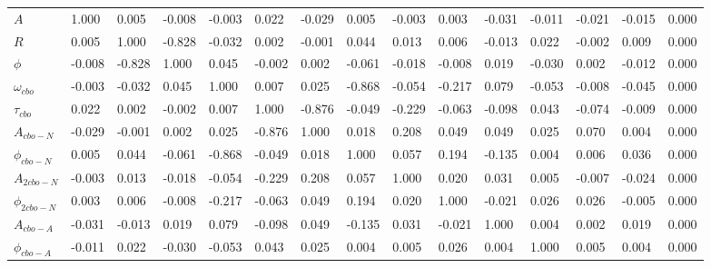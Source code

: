 \begin{landscape}
\begin{table}[]
\setlength\tabcolsep{5pt}
\footnotesize
\begin{tabular*}{\linewidth}{@{\extracolsep{\fill}}lLBLLLLLLLLLLLL}
  \toprule
            &  &  & \thead{$\phi$} &  &  &  &  &  &  &  &  &  &  &  \\
  \midrule
$A$                & 1.000 & 0.005 & -0.008 & -0.003 & 0.022 & -0.029 & 0.005 & -0.003 & 0.003 & -0.031 & -0.011 & -0.021 & -0.015 & 0.000  \\
$R$                & 0.005 & 1.000 & -0.828 & -0.032 & 0.002 & -0.001 & 0.044 & 0.013 & 0.006 & -0.013 & 0.022 & -0.002 & 0.009 & 0.000  \\
$\phi$             & -0.008 & -0.828 & 1.000 & 0.045 & -0.002 & 0.002 & -0.061 & -0.018 & -0.008 & 0.019 & -0.030 & 0.002 & -0.012 & 0.000  \\
$\omega_{cbo}$     & -0.003 & -0.032 & 0.045 & 1.000 & 0.007 & 0.025 & -0.868 & -0.054 & -0.217 & 0.079 & -0.053 & -0.008 & -0.045 & 0.000  \\
$\tau_{cbo}$       & 0.022 & 0.002 & -0.002 & 0.007 & 1.000 & -0.876 & -0.049 & -0.229 & -0.063 & -0.098 & 0.043 & -0.074 & -0.009 & 0.000  \\
$A_{cbo-N}$        & -0.029 & -0.001 & 0.002 & 0.025 & -0.876 & 1.000 & 0.018 & 0.208 & 0.049 & 0.049 & 0.025 & 0.070 & 0.004 & 0.000  \\
$\phi_{cbo-N}$     & 0.005 & 0.044 & -0.061 & -0.868 & -0.049 & 0.018 & 1.000 & 0.057 & 0.194 & -0.135 & 0.004 & 0.006 & 0.036 & 0.000  \\
$A_{2cbo-N}$       & -0.003 & 0.013 & -0.018 & -0.054 & -0.229 & 0.208 & 0.057 & 1.000 & 0.020 & 0.031 & 0.005 & -0.007 & -0.024 & 0.000  \\
$\phi_{2cbo-N}$    & 0.003 & 0.006 & -0.008 & -0.217 & -0.063 & 0.049 & 0.194 & 0.020 & 1.000 & -0.021 & 0.026 & 0.026 & -0.005 & 0.000  \\
$A_{cbo-A}$        & -0.031 & -0.013 & 0.019 & 0.079 & -0.098 & 0.049 & -0.135 & 0.031 & -0.021 & 1.000 & 0.004 & 0.002 & 0.019 & 0.000  \\
$\phi_{cbo-A}$     & -0.011 & 0.022 & -0.030 & -0.053 & 0.043 & 0.025 & 0.004 & 0.005 & 0.026 & 0.004 & 1.000 & 0.005 & 0.004 & 0.000  \\

\end{tabular*}
\end{table}
\end{landscape}
